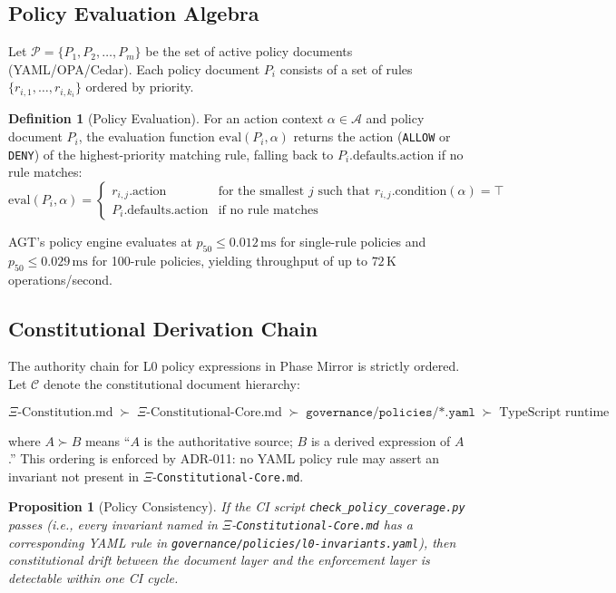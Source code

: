 \documentclass[12pt,a4paper]{article}
\newtheorem{proposition}[theorem]{Proposition}
\theoremstyle{definition}
\newtheorem{definition}[theorem]{Definition}
\theoremstyle{remark}
\begin{document}
\subsection{Policy Evaluation Algebra}

Let $\mathcal{P} = \{P_1, P_2, \ldots, P_m\}$ be the set of active policy
documents (YAML/OPA/Cedar). Each policy document $P_i$ consists of a set of
rules $\{r_{i,1}, \ldots, r_{i,k_i}\}$ ordered by priority.

\begin{definition}[Policy Evaluation]
For an action context $\alpha \in \mathcal{A}$ and policy document $P_i$,
the evaluation function $\text{eval}(P_i, \alpha)$ returns the action
(\texttt{ALLOW} or \texttt{DENY}) of the highest-priority matching rule,
falling back to $P_i.\text{defaults}.\text{action}$ if no rule matches:
\[
  \text{eval}(P_i, \alpha) = \begin{cases}
    r_{i,j}.\text{action} & \text{for the smallest } j \text{ such that }
      r_{i,j}.\text{condition}(\alpha) = \top \\
    P_i.\text{defaults}.\text{action} & \text{if no rule matches}
  \end{cases}
\]
\end{definition}

AGT's policy engine evaluates at $p_{50} \leq 0.012\,\text{ms}$ for single-rule
policies and $p_{50} \leq 0.029\,\text{ms}$ for 100-rule policies, yielding
throughput of up to $72\,\text{K}$ operations/second.

\subsection{Constitutional Derivation Chain}

The authority chain for L0 policy expressions in Phase Mirror is strictly
ordered. Let $\mathcal{C}$ denote the constitutional document hierarchy:

\[
  \Xi\text{-Constitution.md}
  \;\succ\;
  \Xi\text{-Constitutional-Core.md}
  \;\succ\;
  \texttt{governance/policies/*.yaml}
  \;\succ\;
  \text{TypeScript runtime}
\]

where $A \succ B$ means ``$A$ is the authoritative source; $B$ is a derived
expression of $A$.'' This ordering is enforced by ADR-011: no YAML policy rule
may assert an invariant not present in $\Xi$-\texttt{Constitutional-Core.md}.

\begin{proposition}[Policy Consistency]
If the CI script \texttt{check\_policy\_coverage.py} passes (i.e., every invariant
named in $\Xi$-\texttt{Constitutional-Core.md} has a corresponding YAML rule in
\texttt{governance/policies/l0-invariants.yaml}), then constitutional drift
between the document layer and the enforcement layer is detectable within one
CI cycle.
\end{proposition}
\end{document}
